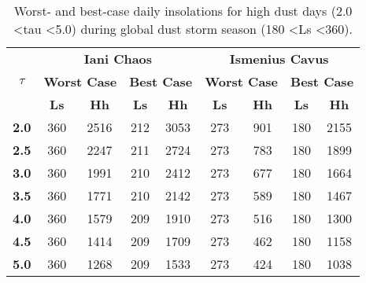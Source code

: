 \begin{table}[h]
\footnotesize
\centering
\caption{Worst- and best-case daily insolations for high dust days (2.0 \textless tau \textless 5.0) during global dust storm season (180 \textless Ls \textless 360).}
\label{tab:insolation-worst-and-best-case-high-dust-days}
\begin{tabular}{|l|c|c|c|c|c|c|c|c|}
\hline
\multicolumn{1}{|c|}{\multirow{3}{*}{\textbf{$\tau$}}} & \multicolumn{4}{c|}{\textbf{Iani Chaos}} & \multicolumn{4}{c|}{\textbf{Ismenius Cavus}} \\ \cline{2-9}
\multicolumn{1}{|c|}{} & \multicolumn{2}{c|}{\textbf{Worst Case}} & \multicolumn{2}{c|}{\textbf{Best Case}} & \multicolumn{2}{c|}{\textbf{Worst Case}} & \multicolumn{2}{c|}{\textbf{Best Case}} \\ \cline{2-9}
\multicolumn{1}{|c|}{} & \textbf{Ls} & \textbf{Hh} & \textbf{Ls} & \textbf{Hh} & \textbf{Ls} & \textbf{Hh} & \textbf{Ls} & \textbf{Hh} \\ \hline
\textbf{2.0} & 360 & 2516 & 212 & 3053 & 273 & 901 & 180 & 2155 \\ \hline
\textbf{2.5} & 360 & 2247 & 211 & 2724 & 273 & 783 & 180 & 1899 \\ \hline
\textbf{3.0} & 360 & 1991 & 210 & 2412 & 273 & 677 & 180 & 1664 \\ \hline
\textbf{3.5} & 360 & 1771 & 210 & 2142 & 273 & 589 & 180 & 1467 \\ \hline
\textbf{4.0} & 360 & 1579 & 209 & 1910 & 273 & 516 & 180 & 1300 \\ \hline
\textbf{4.5} & 360 & 1414 & 209 & 1709 & 273 & 462 & 180 & 1158 \\ \hline
\textbf{5.0} & 360 & 1268 & 209 & 1533 & 273 & 424 & 180 & 1038 \\ \hline
\end{tabular}
\end{table}
